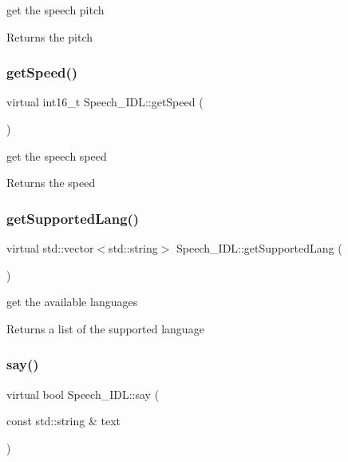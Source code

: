 get the speech pitch 

\begin{DoxyReturn}{Returns}
the pitch 
\end{DoxyReturn}
\mbox{\label{classSpeech__IDL_a41f5ec2698b26193b2819c5acc095ed2}} 
\subsubsection{\texorpdfstring{get\+Speed()}{getSpeed()}}
{\footnotesize\ttfamily virtual int16\+\_\+t Speech\+\_\+\+I\+D\+L\+::get\+Speed (\begin{DoxyParamCaption}{ }\end{DoxyParamCaption})\hspace{0.3cm}{\ttfamily [virtual]}}



get the speech speed 

\begin{DoxyReturn}{Returns}
the speed 
\end{DoxyReturn}
\mbox{\label{classSpeech__IDL_a003d0864e1211db39b8b395e8462f249}} 
\subsubsection{\texorpdfstring{get\+Supported\+Lang()}{getSupportedLang()}}
{\footnotesize\ttfamily virtual std\+::vector$<$std\+::string$>$ Speech\+\_\+\+I\+D\+L\+::get\+Supported\+Lang (\begin{DoxyParamCaption}{ }\end{DoxyParamCaption})\hspace{0.3cm}{\ttfamily [virtual]}}



get the available languages 

\begin{DoxyReturn}{Returns}
a list of the supported language 
\end{DoxyReturn}
\mbox{\label{classSpeech__IDL_a0cc774034f1da13dcaf091c5e65f5a56}} 
\subsubsection{\texorpdfstring{say()}{say()}}
{\footnotesize\ttfamily virtual bool Speech\+\_\+\+I\+D\+L\+::say (\begin{DoxyParamCaption}\item[{const std\+::string \&}]{text }\end{DoxyParamCaption})\hspace{0.3cm}{\ttfamily [virtual]}}



